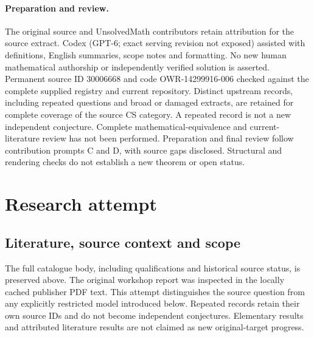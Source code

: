 \documentclass[11pt]{article}
\begin{document}
\paragraph{Preparation and review.}
The original source and UnsolvedMath contributors retain attribution for the source extract. Codex (GPT-6; exact serving revision not exposed) assisted with definitions, English summaries, scope notes and formatting. No new human mathematical authorship or independently verified solution is asserted. Permanent source ID 30006668 and code OWR-14299916-006 checked against the complete supplied registry and current repository. Distinct upstream records, including repeated questions and broad or damaged extracts, are retained for complete coverage of the source CS category. A repeated record is not a new independent conjecture. Complete mathematical-equivalence and current-literature review has not been performed. Preparation and final review follow contribution prompts C and D, with source gaps disclosed. Structural and rendering checks do not establish a new theorem or open status.
\label{end:30006668}

\section{Research attempt}
\subsection{Literature, source context and scope}
The full catalogue body, including qualifications and historical source status, is preserved above. The original workshop report was inspected in the locally cached publisher PDF text. This attempt distinguishes the source question from any explicitly restricted model introduced below. Repeated records retain their own source IDs and do not become independent conjectures. Elementary results and attributed literature results are not claimed as new original-target progress.
\end{document}
